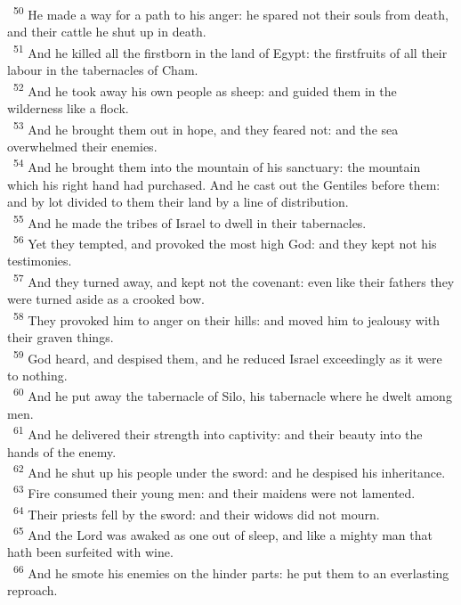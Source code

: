 \documentclass[a5paper,12pt]{article}
\begin{document}
\begin{multicols*}{2}
~\textsuperscript{50} He made a way for a path to his anger: he spared not their souls from death, and their cattle he shut up in death.\\
~\textsuperscript{51} And he killed all the firstborn in the land of Egypt: the firstfruits of all their labour in the tabernacles of Cham.\\
~\textsuperscript{52} And he took away his own people as sheep: and guided them in the wilderness like a flock.\\
~\textsuperscript{53} And he brought them out in hope, and they feared not: and the sea overwhelmed their enemies.\\
~\textsuperscript{54} And he brought them into the mountain of his sanctuary: the mountain which his right hand had purchased. And he cast out the Gentiles before them: and by lot divided to them their land by a line of distribution.\\
~\textsuperscript{55} And he made the tribes of Israel to dwell in their tabernacles.\\
~\textsuperscript{56} Yet they tempted, and provoked the most high God: and they kept not his testimonies.\\
~\textsuperscript{57} And they turned away, and kept not the covenant: even like their fathers they were turned aside as a crooked bow.\\
~\textsuperscript{58} They provoked him to anger on their hills: and moved him to jealousy with their graven things.\\
~\textsuperscript{59} God heard, and despised them, and he reduced Israel exceedingly as it were to nothing.\\
~\textsuperscript{60} And he put away the tabernacle of Silo, his tabernacle where he dwelt among men.\\
~\textsuperscript{61} And he delivered their strength into captivity: and their beauty into the hands of the enemy.\\
~\textsuperscript{62} And he shut up his people under the sword: and he despised his inheritance.\\
~\textsuperscript{63} Fire consumed their young men: and their maidens were not lamented.\\
~\textsuperscript{64} Their priests fell by the sword: and their widows did not mourn.\\
~\textsuperscript{65} And the Lord was awaked as one out of sleep, and like a mighty man that hath been surfeited with wine.\\
~\textsuperscript{66} And he smote his enemies on the hinder parts: he put them to an everlasting reproach.\\

\end{multicols*}
\end{document}
